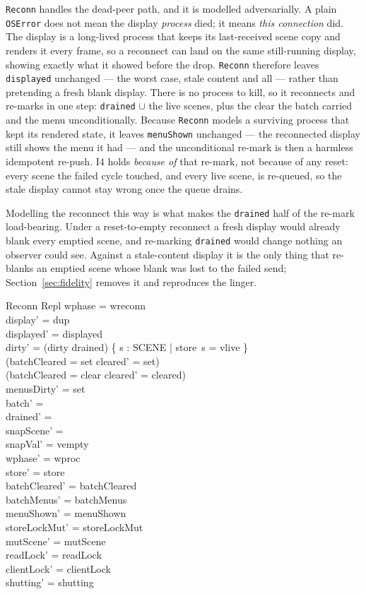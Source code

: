 \documentclass[a4paper,10pt,fleqn]{article}
\begin{document}
\texttt{Reconn} handles the dead-peer path, and it is modelled adversarially.
A plain \texttt{OSError} does not mean the display \emph{process} died; it
means \emph{this connection} did.  The display is a long-lived process that
keeps its last-received scene copy and renders it every frame, so a reconnect
can land on the same still-running display, showing exactly what it showed
before the drop.  \texttt{Reconn} therefore leaves \texttt{displayed}
unchanged --- the worst case, stale content and all --- rather than pretending
a fresh blank display.  There is no process to kill, so it reconnects and
re-marks in one step: \texttt{drained} $\cup$ the live scenes, plus the clear
the batch carried and the menu unconditionally.  Because \texttt{Reconn} models
a surviving process that kept its rendered state, it leaves \texttt{menuShown}
unchanged --- the reconnected display still shows the menu it had --- and the
unconditional re-mark is then a harmless idempotent re-push.  I4 holds
\emph{because of} that re-mark,
not because of any reset: every scene the failed cycle touched, and every live
scene, is re-queued, so the stale display cannot stay wrong once the queue
drains.

Modelling the reconnect this way is what makes the \texttt{drained} half of
the re-mark load-bearing.  Under a reset-to-empty reconnect a fresh display
would already blank every emptied scene, and re-marking \texttt{drained} would
change nothing an observer could see.  Against a stale-content display it is
the only thing that re-blanks an emptied scene whose blank was lost to the
failed send; Section~\ref{sec:fidelity} removes it and reproduces the linger.

\begin{schema}{Reconn}
  \Delta Repl
\where
  wphase = wreconn \\
  display' = dup \\
  displayed' = displayed \\
  dirty' = (dirty \cup drained) \cup \{ s : SCENE | store~s = vlive \} \\
  (batchCleared = set \implies cleared' = set) \\
  (batchCleared = clear \implies cleared' = cleared) \\
  menusDirty' = set \\
  batch' = \emptyset \\
  drained' = \emptyset \\
  snapScene' = \emptyset \\
  snapVal' = vempty \\
  wphase' = wproc \\
  store' = store \\
  batchCleared' = batchCleared \\
  batchMenus' = batchMenus \\
  menuShown' = menuShown \\
  storeLockMut' = storeLockMut \\
  mutScene' = mutScene \\
  readLock' = readLock \\
  clientLock' = clientLock \\
  shutting' = shutting
\end{schema}
\end{document}

